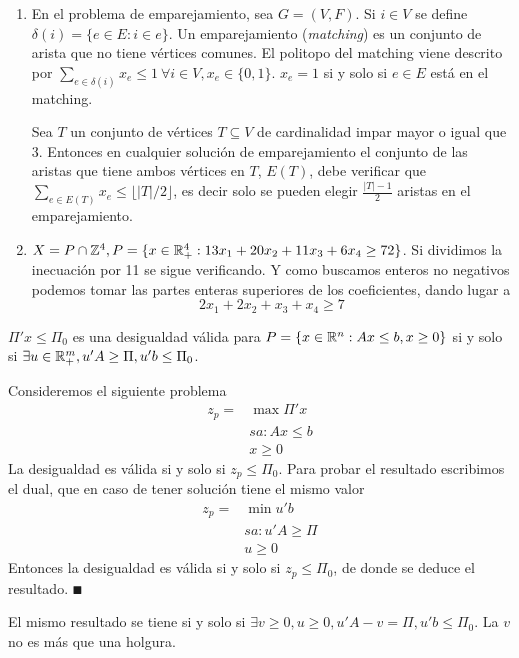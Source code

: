 \documentclass[MIOP.tex]{subfiles}
\begin{document}
\begin{ejs}
\begin{enumerate}
\item En el problema de emparejamiento, sea $G=(V,F)$. Si $i\in V$ se define $\delta(i)=\{e\in E:i\in e\}$. Un emparejamiento (\emph{matching}) es un conjunto de arista que no tiene vértices comunes. El politopo del matching viene descrito por $\sum_{e\in\delta(i)}x_e\leq 1\ \forall i\in V, x_e\in\{0,1\}$. $x_e=1$ si y solo si $e\in E$ está en el matching.  

Sea $T$ un conjunto de vértices $T\subseteq V$ de cardinalidad impar mayor o igual que 3. Entonces en cualquier solución de emparejamiento el conjunto de las aristas que tiene ambos vértices en $T$, $E(T)$, debe verificar que $\sum_{e\in E(T)}x_e\leq\lfloor |T|/2\rfloor$, es decir solo se pueden elegir $\frac{|T|-1}{2}$ aristas en el emparejamiento.
\item $X=P\cap\mathbb{Z}^4, P=\{x\in\mathbb{R}^4_+:13x_1+20x_2+11x_3+6x_4\geq 72\}$. Si dividimos la inecuación por 11 se sigue verificando. Y como buscamos enteros no negativos podemos tomar las partes enteras superiores de los coeficientes, dando lugar a 
$$2x_1+2x_2+x_3+x_4\geq 7$$
\end{enumerate}
\end{ejs}

\begin{prop}
$\Pi'x\leq\Pi_0$ es una desigualdad válida para $P=\{x\in\mathbb{R}^n:Ax\leq b,x\geq 0\}$ si y solo si $\exists u\in\mathbb{R}^m_+,u'A\geq\Pi,u'b\leq\Pi_0$.
\end{prop}
\begin{dem}
Consideremos el siguiente problema
\begin{align*}
z_p=& \max \Pi'x\\
   &sa: Ax\leq b\\
   &x\geq 0
\end{align*}
La desigualdad es válida si y solo si $z_p\leq\Pi_0$. Para probar el resultado escribimos el dual, que en caso de tener solución tiene el mismo valor
\begin{align*}
z_p=& \min u'b\\
   &sa: u'A\geq \Pi\\
   &u\geq 0
\end{align*}
Entonces la desigualdad es válida si y solo si $z_p\leq\Pi_0$, de donde se deduce el resultado. 
$\QED$
\end{dem}
\begin{coro}
El mismo resultado se tiene si y solo si $\exists v\geq 0, u\geq 0, u'A-v= \Pi, u'b\leq\Pi_0$. La $v$ no es más que una holgura.
\end{coro}
\end{document}
